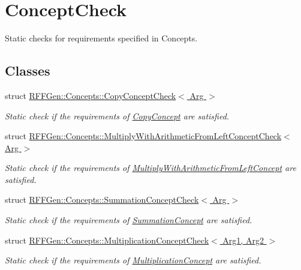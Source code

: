 \hypertarget{group__ConceptCheck}{\section{Concept\-Check}
\label{group__ConceptCheck}
}


Static checks for requirements specified in Concepts.  


\subsection*{Classes}
\begin{DoxyCompactItemize}
\item 
struct \hyperlink{structRFFGen_1_1Concepts_1_1CopyConceptCheck}{R\-F\-F\-Gen\-::\-Concepts\-::\-Copy\-Concept\-Check$<$ Arg $>$}
\begin{DoxyCompactList}\small\item\em Static check if the requirements of \hyperlink{structRFFGen_1_1Concepts_1_1CopyConcept}{Copy\-Concept} are satisfied. \end{DoxyCompactList}\item 
struct \hyperlink{structRFFGen_1_1Concepts_1_1MultiplyWithArithmeticFromLeftConceptCheck}{R\-F\-F\-Gen\-::\-Concepts\-::\-Multiply\-With\-Arithmetic\-From\-Left\-Concept\-Check$<$ Arg $>$}
\begin{DoxyCompactList}\small\item\em Static check if the requirements of \hyperlink{structRFFGen_1_1Concepts_1_1MultiplyWithArithmeticFromLeftConcept}{Multiply\-With\-Arithmetic\-From\-Left\-Concept} are satisfied. \end{DoxyCompactList}\item 
struct \hyperlink{structRFFGen_1_1Concepts_1_1SummationConceptCheck}{R\-F\-F\-Gen\-::\-Concepts\-::\-Summation\-Concept\-Check$<$ Arg $>$}
\begin{DoxyCompactList}\small\item\em Static check if the requirements of \hyperlink{structRFFGen_1_1Concepts_1_1SummationConcept}{Summation\-Concept} are satisfied. \end{DoxyCompactList}\item 
struct \hyperlink{structRFFGen_1_1Concepts_1_1MultiplicationConceptCheck}{R\-F\-F\-Gen\-::\-Concepts\-::\-Multiplication\-Concept\-Check$<$ Arg1, Arg2 $>$}
\begin{DoxyCompactList}\small\item\em Static check if the requirements of \hyperlink{structRFFGen_1_1Concepts_1_1MultiplicationConcept}{Multiplication\-Concept} are satisfied. \end{DoxyCompactList}\item 

\end{DoxyCompactItemize}
